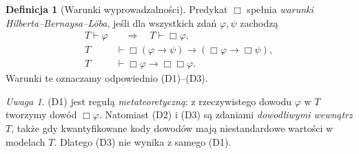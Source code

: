 \documentclass[11pt,a4paper]{article}
\numberwithin{equation}{section}
\theoremstyle{plain}
\theoremstyle{definition}
\newtheorem{definicja}[twierdzenie]{Definicja}
\theoremstyle{remark}
\newtheorem{uwaga}[twierdzenie]{Uwaga}
\begin{document}
\begin{definicja}[Warunki wyprowadzalności]\label{res:11:1}
Predykat $\Box$ spełnia \emph{warunki Hilberta--Bernaysa--Löba}, jeśli dla wszystkich zdań $\varphi,\psi$ zachodzą
\begin{align}
T\vdash\varphi&\quad\Longrightarrow\quad T\vdash\Box\varphi,\label{eq:11:1}\\
T&\vdash\Box(\varphi\to\psi)\to(\Box\varphi\to\Box\psi),\label{eq:11:2}\\
T&\vdash\Box\varphi\to\Box\Box\varphi.\label{eq:11:3}
\end{align}
Warunki te oznaczamy odpowiednio (D1)--(D3).
\end{definicja}

\begin{uwaga}\label{res:11:2}
(D1) jest regułą \emph{metateoretyczną}: z rzeczywistego dowodu $\varphi$ w $T$ tworzymy dowód $\Box\varphi$. Natomiast (D2) i (D3) są zdaniami \emph{dowodliwymi wewnątrz} $T$, także gdy kwantyfikowane kody dowodów mają niestandardowe wartości w modelach $T$. Dlatego (D3) nie wynika z samego (D1).
\end{uwaga}
\end{document}
